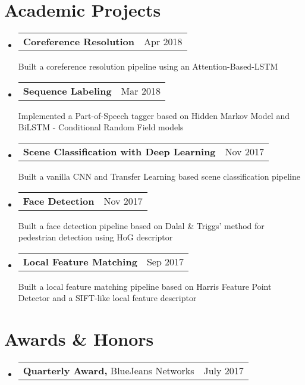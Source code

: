 \documentclass[letterpaper,11pt]{article}
\makeatletter
\newcommand{\teachingExperienceRow}[2]{
  \vspace{-1pt}\item[]
    \begin{tabular*}{0.97\textwidth}{l@{\extracolsep{\fill}}r}
    \small{#1} & \small{#2}
    \end{tabular*}\vspace{-7pt}
}
\newcommand{\resumeSubItem}[3]{
  \vspace{-1pt}\item[]
    \begin{tabular*}{0.97\textwidth}{l@{\extracolsep{\fill}}r}
      \textbf{\small#1} & {\small#2}
    \end{tabular*}
    {\small#3}\vspace{-5pt}
}
\newcommand{\resumeSubHeadingListStart}{\begin{itemize}[label={}, leftmargin=*]}
\newcommand{\resumeSubHeadingListEnd}{\end{itemize}}
\makeatother
\begin{document}
\section{Academic Projects}
  \resumeSubHeadingListStart    
  \resumeSubItem{Coreference Resolution}{Apr 2018}{Built a coreference resolution pipeline using an Attention-Based-LSTM}
  \resumeSubItem{Sequence Labeling}{Mar 2018}{Implemented a Part-of-Speech tagger based on Hidden Markov Model and BiLSTM - Conditional Random Field models}
    \resumeSubItem{Scene Classification with Deep Learning}{Nov 2017}{Built a vanilla CNN and Transfer Learning based scene classification pipeline}
    \resumeSubItem{Face Detection}{Nov 2017} {Built a face detection pipeline based on Dalal \& Triggs’ method for pedestrian detection using HoG descriptor}
    \resumeSubItem{Local Feature Matching}{Sep 2017} {Built a local feature matching pipeline based on Harris Feature Point Detector and a SIFT-like local feature descriptor}
  \resumeSubHeadingListEnd

\vspace{-7pt}
\section{Awards \& Honors}
  \vspace{-2pt} \resumeSubHeadingListStart
   \teachingExperienceRow {\textbf{Quarterly Award,} BlueJeans Networks}{July 2017}
   \resumeSubHeadingListEnd

\end{document}
